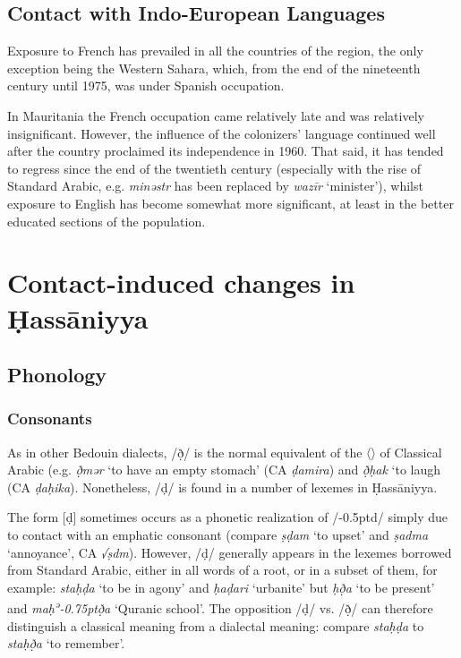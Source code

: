\documentclass[output=paper]{langsci/langscibook}
\begin{document}
\subsection{Contact with Indo-European Languages} %

Exposure to French has prevailed in all the countries of the region, the only exception being the Western Sahara, which, from the end of the nineteenth century until 1975, was under Spanish occupation.

In Mauritania the French occupation came relatively late and was relatively insignificant. However, the influence of the colonizers’ language continued well after the country proclaimed its independence in 1960. That said, it has tended to regress since the end of the twentieth century (especially with the rise of Standard Arabic, e.g. \textit{minəstr} has been replaced by \textit{wazīr} ‘minister’), whilst exposure to English has become somewhat more significant, at least in the better educated sections of the population.

\section{Contact-induced changes in  Ḥassāniyya} %

\subsection{Phonology} %

\subsubsection{Consonants} %
As in other Bedouin dialects, /ð̣/ is the normal equivalent of the 〈〉 of Classical Arabic (e.g. \textit{ð̣mər} ‘to have an empty stomach’ (CA \textit{ḍamira}) and \textit{ð̣ḥak} ‘to laugh (CA \textit{ḍaḥika}). Nonetheless, /ḍ/ is found in a number of lexemes in Ḥassāniyya. 

The form [ḍ] sometimes occurs as a phonetic realization of /\kern -0.5ptd/ simply due to contact with an emphatic consonant (compare \textit{ṣḍam} ‘to upset’ and \textit{ṣadma} ‘annoyance’, CA \textit{√ṣdm}). However, /ḍ/ generally appears in the lexemes borrowed from Standard Arabic, either in all words of a root, or in a subset of them, for example: \textit{staḥḍa{\R}} ‘to be in agony’ and \textit{ḥaḍari} ‘urbanite’ but \textit{ḥð̣a{\R}} ‘to be present’ and \textit{maḥ\textsuperscript{ə}\kern -0.75ptð̣{\R}a} ‘Quranic school’. The opposition /ḍ/ vs. /ð̣/ can therefore distinguish a classical meaning from a dialectal meaning: compare \textit{staḥḍa{\R}} to \textit{staḥð̣a{\R}} ‘to remember’.
\end{document}
